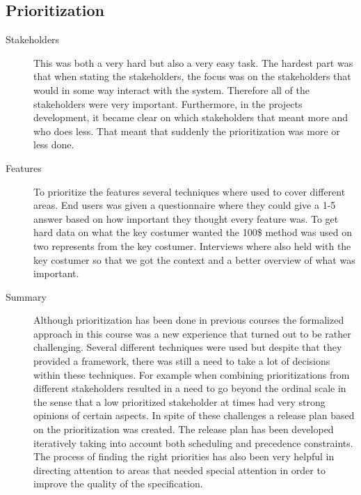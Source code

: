\documentclass[10pt,a4paper]{article}
\begin{document}
\subsection{Prioritization}
\begin{description}
\item[Stakeholders] This was both a very hard but also a very easy task. The hardest part was that when stating the stakeholders, the focus was on the stakeholders that would in some way interact with the system. Therefore all of the stakeholders were very important. Furthermore, in the projects development, it became clear on which stakeholders that meant more and who does less. That meant that suddenly the prioritization was more or less done.
\item[Features] To prioritize the features several techniques where used to cover different areas. End users was given a questionnaire where they could give a 1-5 answer based on how important they thought every feature was. To get hard data on what the key costumer wanted the 100\$ method was used on two represents from the key costumer. Interviews where also held with the key costumer so that we got the context and a better overview of what was important.
\item[Summary] Although prioritization has been done in previous courses the formalized approach in this course was  a new experience that turned out to be rather challenging. Several different techniques were used but despite that they provided a framework, there was still a need to take a lot of decisions within these techniques. For example when combining prioritizations from different stakeholders resulted in a need to go beyond the ordinal scale in the sense that a low prioritized stakeholder at times had very strong opinions of certain aspects. In spite of these challenges a release plan based on the prioritization was created. The release plan has been developed iteratively taking into account both scheduling and precedence constraints. The process of finding the right priorities has also been very helpful in directing attention to areas that needed special attention in order to improve the quality of the specification. 
\end{description}
\end{document}
